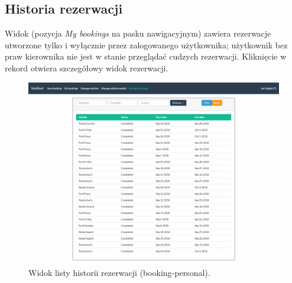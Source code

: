 \documentclass[eng,printmode,openany]{mgr}
\begin{document}
\begin{appendices}
		\section{Historia rezerwacji}
		Widok (pozycja \textit{My bookings} na pasku nawigacyjnym) zawiera rezerwacje utworzone tylko i wyłącznie przez zalogowanego użytkownika; użytkownik bez praw kierownika nie jest w stanie przeglądać cudzych rezerwacji. Kliknięcie w rekord otwiera szczegółowy widok rezerwacji.
		\begin{figure}[H]
			\centering
			\includegraphics[width=\textwidth]{images/views/booking-list-manage.png}
			\caption{Widok listy historii rezerwacji (booking-personal).}	
		\end{figure}
		
		\newpage

\end{appendices}
\end{document}
